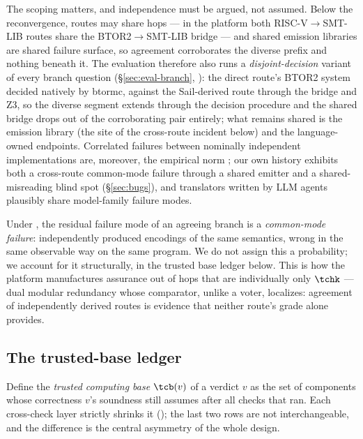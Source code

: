 The scoping matters, and independence must be argued, not assumed. Below
the reconvergence, routes may share hops --- in the platform both
RISC-V$\to$SMT-LIB routes share the BTOR2$\to$SMT-LIB bridge --- and
shared emission libraries are shared failure surface, so agreement
corroborates the diverse prefix and nothing beneath it. The evaluation
therefore also runs a \emph{disjoint-decision} variant of every branch
question (\S\ref{sec:eval-branch}, ): the direct route's BTOR2 system
decided natively by btormc, against the Sail-derived route through the
bridge and Z3, so the diverse segment extends through the decision
procedure and the shared bridge drops out of the corroborating pair
entirely; what remains shared is the emission library (the site of the
cross-route incident below) and the language-owned endpoints. Correlated
failures between nominally independent implementations are, moreover,
the empirical norm \citep{knight1986independence}; our own history
exhibits both a cross-route common-mode failure through a shared emitter
and a shared-misreading blind spot (\S\ref{sec:bugs}), and translators
written by LLM agents plausibly share model-family failure modes.

Under , the residual failure mode of an agreeing
branch is a \emph{common-mode failure}: independently produced encodings
of the same semantics, wrong in the same observable way on the same
program. We do not assign this a probability; we account for it
structurally, in the trusted base ledger below. This is how the platform
manufactures assurance out of hops that are individually only
$\tchk$ --- dual modular redundancy whose comparator, unlike a voter,
localizes: agreement of independently derived routes is evidence that
neither route's grade alone provides.

\subsection{The trusted-base ledger}
\label{sec:tcb}

Define the \emph{trusted computing base} $\tcb(v)$ of a verdict $v$ as
the set of components whose correctness $v$'s soundness still assumes
after all checks that ran. Each cross-check layer strictly shrinks it
(); the last two rows are not interchangeable, and the
difference is the central asymmetry of the whole design.

